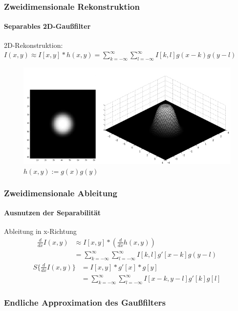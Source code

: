 \documentclass[12pt, a4paper, oneside]{article}
\begin{document}
\subsubsection{Zweidimensionale Rekonstruktion}
\paragraph*{Separables 2D-Gaußfilter}
2D-Rekonstruktion: $I(x,y)\approx I[x,y]*h(x,y)=\sum\limits _{k=-\infty}^{\infty}\sum\limits_{l=-\infty}^{\infty}I[k,l]g(x-k)g(y-l)$
\begin{figure}[htbp]
    \centering
    \includegraphics[scale=1]{../img/1-10.png}
    \caption{$h(x,y):=g(x)g(y)$}
    \label{img/1-10}
\end{figure}

\subsubsection{Zweidimensionale Ableitung}
\paragraph*{Ausnutzen der Separabilität}
Ableitung in x-Richtung
\begin{align*}
    \frac{d}{dx}I(x,y) & \approx I[x,y]*(\frac{d}{dx}h(x,y)) \\
    & = \sum\limits_{k=-\infty}^{\infty} \sum\limits_{l=-\infty}^{\infty}I[k,l]g'[x-k]g(y-l)
\end{align*}
\begin{align*}
    S\{\frac{d}{dx}I(x,y)\} & = I[x,y]*g'[x]*g[y] \\
    & = \sum\limits_{k=-\infty}^{\infty} \sum\limits_{l=-\infty}^{\infty}I[x-k,y-l]g'[k]g[l]
\end{align*}

\subsubsection{Endliche Approximation des Gaußfilters}
\end{document}
